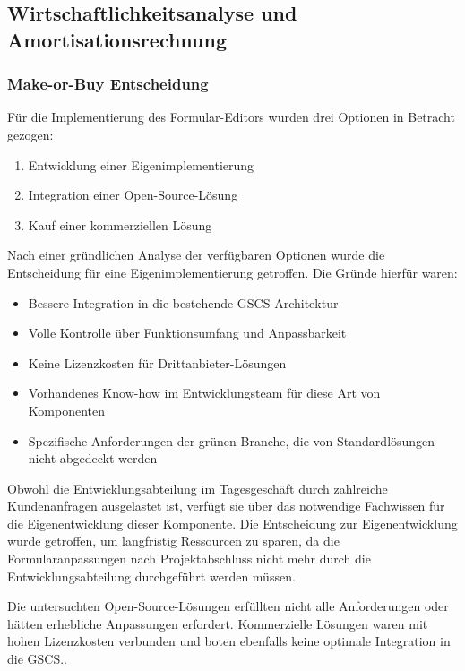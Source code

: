 \documentclass[a4paper,11pt]{article}
\begin{document}
\subsection{Wirtschaftlichkeitsanalyse und Amortisationsrechnung}
\subsubsection{Make-or-Buy Entscheidung}
Für die Implementierung des Formular-Editors wurden drei Optionen in Betracht gezogen:

\begin{enumerate}
  \item Entwicklung einer Eigenimplementierung
  \item Integration einer Open-Source-Lösung
  \item Kauf einer kommerziellen Lösung
\end{enumerate}

\noindent Nach einer gründlichen Analyse der verfügbaren Optionen wurde die Entscheidung für eine Eigenimplementierung getroffen. Die Gründe hierfür waren:

\begin{itemize}
  \item Bessere Integration in die bestehende GSCS-Architektur
  \item Volle Kontrolle über Funktionsumfang und Anpassbarkeit
  \item Keine Lizenzkosten für Drittanbieter-Lösungen
  \item Vorhandenes Know-how im Entwicklungsteam für diese Art von Komponenten
  \item Spezifische Anforderungen der grünen Branche, die von Standardlösungen nicht abgedeckt werden
\end{itemize}

\noindent Obwohl die Entwicklungsabteilung im Tagesgeschäft durch zahlreiche Kundenanfragen ausgelastet ist, verfügt sie über das notwendige Fachwissen für die Eigenentwicklung dieser Komponente. Die Entscheidung zur Eigenentwicklung wurde getroffen, um langfristig Ressourcen zu sparen, da die Formularanpassungen nach Projektabschluss nicht mehr durch die Entwicklungsabteilung durchgeführt werden müssen.

\noindent Die untersuchten Open-Source-Lösungen erfüllten nicht alle Anforderungen oder hätten erhebliche Anpassungen erfordert. Kommerzielle Lösungen waren mit hohen Lizenzkosten verbunden und boten ebenfalls keine optimale Integration in die GSCS..
\end{document}
